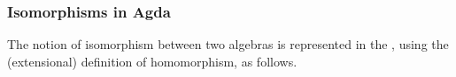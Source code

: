 \documentclass[a4paper,USenglish,cleveref,autoref,thm-restate]{lipics-v2019}
\begin{document}
\subsubsection{Isomorphisms in Agda}\label{isomorphism}
The notion of isomorphism between two algebras is represented in the \agdaualib, using the (extensional) definition of homomorphism, as follows.
\begin{code}\end{code}

\begin{comment}
  \subsection{Homomorphic images}\label{homomorphic-images}
  The following seem to be (for our purposes) the two most useful types for representing homomomrphic images of an algebra.
  \begin{code}\end{code}

  Here are some further definitions, derived from the one above, that will come in handy later.
  \begin{code}\end{code}

  Here 𝓛𝓚 represents a (universe-indexed) collection of classes.
  \begin{code}\end{code}
\end{comment}

\end{document}
